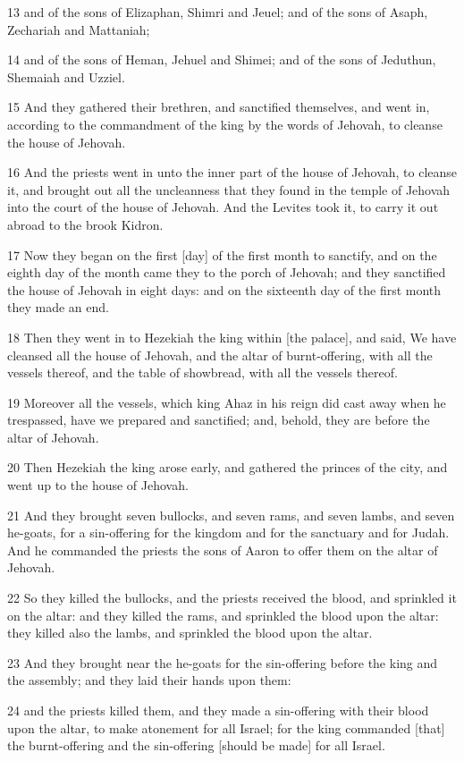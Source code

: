 \par 13 and of the sons of Elizaphan, Shimri and Jeuel; and of the sons of Asaph, Zechariah and Mattaniah;
\par 14 and of the sons of Heman, Jehuel and Shimei; and of the sons of Jeduthun, Shemaiah and Uzziel.
\par 15 And they gathered their brethren, and sanctified themselves, and went in, according to the commandment of the king by the words of Jehovah, to cleanse the house of Jehovah.
\par 16 And the priests went in unto the inner part of the house of Jehovah, to cleanse it, and brought out all the uncleanness that they found in the temple of Jehovah into the court of the house of Jehovah. And the Levites took it, to carry it out abroad to the brook Kidron.
\par 17 Now they began on the first [day] of the first month to sanctify, and on the eighth day of the month came they to the porch of Jehovah; and they sanctified the house of Jehovah in eight days: and on the sixteenth day of the first month they made an end.
\par 18 Then they went in to Hezekiah the king within [the palace], and said, We have cleansed all the house of Jehovah, and the altar of burnt-offering, with all the vessels thereof, and the table of showbread, with all the vessels thereof.
\par 19 Moreover all the vessels, which king Ahaz in his reign did cast away when he trespassed, have we prepared and sanctified; and, behold, they are before the altar of Jehovah.
\par 20 Then Hezekiah the king arose early, and gathered the princes of the city, and went up to the house of Jehovah.
\par 21 And they brought seven bullocks, and seven rams, and seven lambs, and seven he-goats, for a sin-offering for the kingdom and for the sanctuary and for Judah. And he commanded the priests the sons of Aaron to offer them on the altar of Jehovah.
\par 22 So they killed the bullocks, and the priests received the blood, and sprinkled it on the altar: and they killed the rams, and sprinkled the blood upon the altar: they killed also the lambs, and sprinkled the blood upon the altar.
\par 23 And they brought near the he-goats for the sin-offering before the king and the assembly; and they laid their hands upon them:
\par 24 and the priests killed them, and they made a sin-offering with their blood upon the altar, to make atonement for all Israel; for the king commanded [that] the burnt-offering and the sin-offering [should be made] for all Israel.
